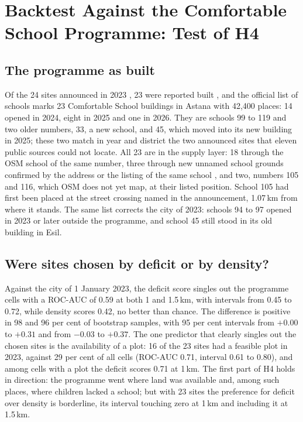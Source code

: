 \section{Backtest Against the Comfortable School Programme: Test of H4}
\label{sec:results-h4}

\subsection{The programme as built}
\label{sec:programme-list}

Of the 24 sites announced in 2023 \cite{skc2023}, 23 were reported built \cite{skc2024}, and the official list of schools \cite{schoolregister2026} marks 23 Comfortable School buildings in Astana with 42,400 places: 14 opened in 2024, eight in 2025 and one in 2026. They are schools 99 to 119 and two older numbers, 33, a new school, and 45, which moved into its new building in 2025; these two match in year and district the two announced sites that eleven public sources could not locate. All 23 are in the supply layer: 18 through the OSM school of the same number, three through new unnamed school grounds confirmed by the address or the listing of the same school \cite{twogis2026}, and two, numbers 105 and 116, which OSM does not yet map, at their listed position. School 105 had first been placed at the street crossing named in the announcement, 1.07\,km from where it stands. The same list corrects the city of 2023: schools 94 to 97 opened in 2023 or later outside the programme, and school 45 still stood in its old building in Esil.

\subsection{Were sites chosen by deficit or by density?}

Against the city of 1 January 2023, the deficit score singles out the programme cells with a ROC-AUC of 0.59 at both 1 and 1.5\,km, with intervals from 0.45 to 0.72, while density scores 0.42, no better than chance. The difference is positive in 98 and 96 per cent of bootstrap samples, with 95 per cent intervals from $+0.00$ to $+0.31$ and from $-0.03$ to $+0.37$. The one predictor that clearly singles out the chosen sites is the availability of a plot: 16 of the 23 sites had a feasible plot in 2023, against 29 per cent of all cells (ROC-AUC 0.71, interval 0.61 to 0.80), and among cells with a plot the deficit scores 0.71 at 1\,km. The first part of H4 holds in direction: the programme went where land was available and, among such places, where children lacked a school; but with 23 sites the preference for deficit over density is borderline, its interval touching zero at 1\,km and including it at 1.5\,km.


